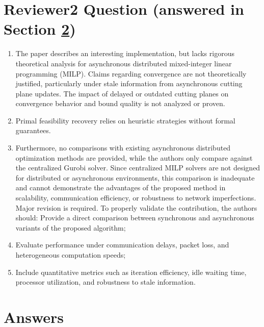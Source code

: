\documentclass[11pt]{article}
\begin{document}
\section{Reviewer2 Question (answered in Section \ref{r2ans})}
\begin{enumerate}
    \item The paper describes an interesting implementation, but lacks rigorous theoretical analysis for asynchronous distributed mixed-integer linear programming (MILP). Claims regarding convergence are not theoretically justified, particularly under stale information from asynchronous cutting plane updates. The impact of delayed or outdated cutting planes on convergence behavior and bound quality is not analyzed or proven. 
    \item Primal feasibility recovery relies on heuristic strategies without formal guarantees.
    \item Furthermore, no comparisons with existing asynchronous distributed optimization methods are provided, while the authors only compare against the centralized Gurobi solver. Since centralized MILP solvers are not designed for distributed or asynchronous environments, this comparison is inadequate and cannot demonstrate the advantages of the proposed method in scalability, communication efficiency, or robustness to network imperfections. Major revision is required. To properly validate the contribution, the authors should: Provide a direct comparison between synchronous and asynchronous variants of the proposed algorithm;
    \item Evaluate performance under communication delays, packet loss, and heterogeneous computation speeds;
    \item Include quantitative metrics such as iteration efficiency, idle waiting time, processor utilization, and robustness to stale information.
\end{enumerate}

\section{Answers}\label{r2ans}
\end{document}
